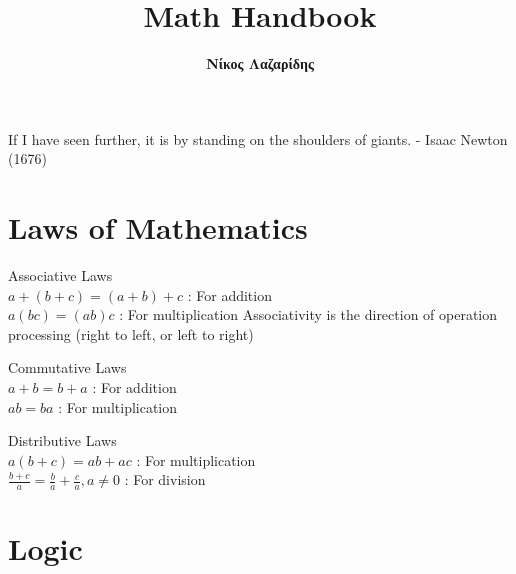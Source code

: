 \documentclass[12pt]{article}
\begin{document}
\tableofcontents
\title{Math Handbook}
\author{\textbf{\textgreek{Νίκος Λαζαρίδης}}}
\maketitle


\pagebreak

\vspace*{\fill} 
	If I have seen further, it is by standing on the shoulders of giants. - Isaac Newton (1676)
\vspace*{\fill}

\pagebreak


\section{Laws of Mathematics}

\begin{flushleft}

\textbullet \quad Associative Laws \\
$\displaystyle  a + (b + c) = (a + b) + c $ 	: For addition \\
$\displaystyle  a(bc)= (ab)c $ \hspace{54pt}: For multiplication \linebreak 
Associativity is the direction of operation processing (right to left, or left to right) \linebreak 

\textbullet \quad Commutative Laws \\
$\displaystyle  a + b = b +a  $ \hspace{54pt}: For addition \\
$\displaystyle  ab = ba $ 		   \hspace{83pt}: For multiplication \linebreak

\textbullet \quad Distributive Laws \\
$\displaystyle a(b + c) = ab + ac $ \hspace{30pt}: For multiplication\\
$\displaystyle \frac{b+c}{a} = \frac{b}{a} + \frac{c}{a}, a \neq 0 $ \hspace{15pt}: For division \\	

\end{flushleft}

\pagebreak

\section{Logic	}
\end{document}
